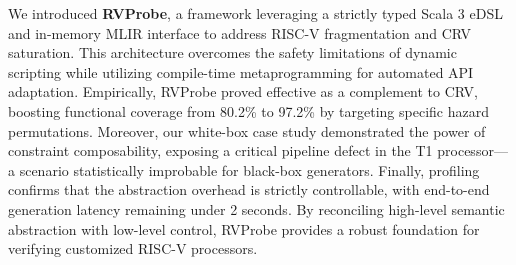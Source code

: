 \documentclass[sigconf]{acmart}
\begin{document}
We introduced \textbf{RVProbe}, a framework leveraging a strictly typed Scala 3 eDSL and in-memory MLIR interface to address RISC-V fragmentation and CRV saturation. This architecture overcomes the safety limitations of dynamic scripting while utilizing compile-time metaprogramming for automated API adaptation. Empirically, RVProbe proved effective as a complement to CRV, boosting functional coverage from 80.2\% to 97.2\% by targeting specific hazard permutations. Moreover, our white-box case study demonstrated the power of constraint composability, exposing a critical pipeline defect in the T1 processor—a scenario statistically improbable for black-box generators. Finally, profiling confirms that the abstraction overhead is strictly controllable, with end-to-end generation latency remaining under 2 seconds. By reconciling high-level semantic abstraction with low-level control, RVProbe provides a robust foundation for verifying customized RISC-V processors.
\end{document}
